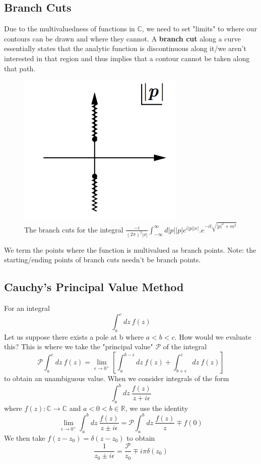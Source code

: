 \subsection{Branch Cuts}
Due to the multivaluedness of functions in $\mathbb{C}$, we need to set "limits" to where our contours can be drawn and where they cannot. A \textbf{branch cut} along a curve essentially states that the analytic function is discontinuous along it/we aren't interested in that region and thus implies that a contour cannot be taken along that path.
\begin{figure}
	\centering
	\includegraphics[scale=0.5]{Figures/branc.png}
	\caption{The branch cuts for the integral $\frac{-i}{{(2 \pi)}^{2}|x|}\int_{-\infty}^{\infty}d|p||p|e^{i|p||x|}.e^{-it\sqrt{{|p|}^{2}+{m}^{2}}}$}
\end{figure}
We term the points where the function is multivalued as branch points. Note: the starting/ending points of branch cuts needn't be branch points.

\subsection{Cauchy's Principal Value Method}
For an integral
\begin{equation}
    \int^{c}_{a} dz \ f(z)
\end{equation}
Let us suppose there exists a pole at b where $a < b < c$. How would we evaluate this? This is where we take the "principal value" $\mathcal{P}$ of the integral
\begin{equation}
    \mathcal{P} \int^{c}_{a} dz \ f(z) = \lim_{\epsilon \rightarrow 0^{+}} \left[  \int^{b- \epsilon}_{a} dz \ f(z) + \int^{c}_{b + \epsilon} dz \ f(z) \right]
\end{equation}
to obtain an unambiguous value. When we consider integrals of the form
\begin{equation}
    \int^{b}_{a} dz \ \frac{f(z)}{z + i \epsilon}
\end{equation}
where $f(z): \mathbb{C} \rightarrow \mathbb{C}$ and $a < 0 < b \in \mathbb{R}$, we use the identity
\begin{equation}
    \lim_{\epsilon \rightarrow 0^{+}} \int^{b}_{a} dz \ \frac{f(z)}{z \pm i \epsilon}  = \mathcal{P} \int^{b}_{a} dz \ \frac{f(z)}{z} \mp f(0)
\end{equation}
We then take $f(z - z_{0}) = \delta (z - z_{0})$ to obtain
\begin{equation}
    \frac{1}{z_{0} \pm i \epsilon} = \frac{\mathcal{P}}{z_{0}} \mp i \pi \delta(z_{0})
\end{equation}
